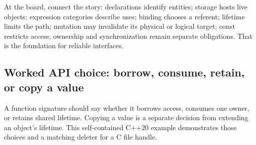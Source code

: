 At the board, connect the story: declarations identify entities; storage hosts live objects; expression categories describe uses; binding chooses a referent; lifetime limits the path; mutation may invalidate its physical or logical target; const restricts access; ownership and synchronization remain separate obligations. That is the foundation for reliable interfaces.

\subsection{Worked API choice: borrow, consume, retain, or copy a value}\label{01-foundations-i-ch003-worked-api-choice-borrow-consume-retain-or-copy-a-value}

\hypertarget{01-foundations-i-ch003-worked-api-choice-borrow-consume-retain-or-copy-a-value}{}

A function signature should say whether it borrows access, consumes one owner, or retains shared lifetime. Copying a value is a separate decision from extending an object's lifetime. This self-contained C++20 example demonstrates those choices and a matching deleter for a C file handle.

